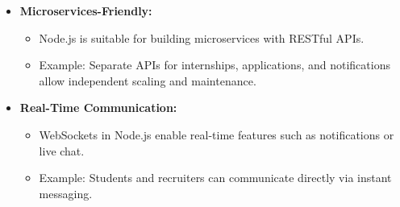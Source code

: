 \begin{itemize}
\begin{itemize}
    \end{itemize}
    \item \textbf{Microservices-Friendly:}
    \begin{itemize}
        \item Node.js is suitable for building microservices with RESTful APIs.
        \item Example: Separate APIs for internships, applications, and notifications allow independent scaling and maintenance.
    \end{itemize}
    \item \textbf{Real-Time Communication:}
    \begin{itemize}
        \item WebSockets in Node.js enable real-time features such as notifications or live chat.
        \item Example: Students and recruiters can communicate directly via instant messaging.
    \end{itemize}
\end{itemize}

